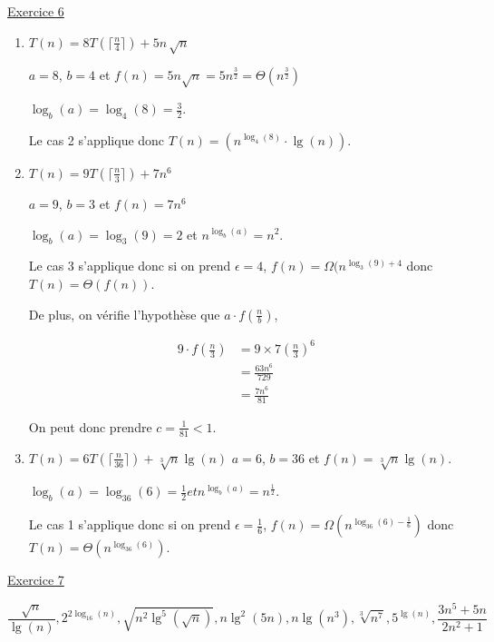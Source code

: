 \documentclass[11pt]{article}
\begin{document}
\bigskip

\underline{Exercice 6} 



\begin{enumerate}[label=\alph*)]
   \item $T(n)=8 T \left( \lceil{\frac{n}{4}} \rceil\right) + 5 n \, \sqrt{n} $
   
   $a=8$, $b=4$ et $f(n) = 5n\sqrt{n} = 5n^{\frac{3}{2}} = \Theta(n^{\frac{3}{2}})$

   $\log_b(a) = \log_4(8) = \frac{3}{2}$.

    Le cas 2 s'applique donc $T(n)=\left(n^{\log_4(8)}\cdot \lg(n)\right)$.
    
     \item $T(n)=9T \left( \lceil{\frac{n}{3}} \rceil\right) + 7n^6 $

    $a=9$, $b=3$ et $f(n) = 7n^{6}$

    $\log_b(a) = \log_3(9) = 2$ et $n^{\log_b(a)}=n^{2}$.

    Le cas 3 s'applique donc si on prend $\epsilon=4$, $f(n) = \Omega(n^{\log_3(9)+4}$ donc $T(n)=\Theta(f(n))$.
    
    De plus, on vérifie l'hypothèse que $a\cdot f\left(\frac{n}{b}\right)$,
    
    \begin{align*}
        9\cdot f\left(\frac{n}{3}\right) &= 9 \times 7\left(\frac{n}{3}\right)^{6}\\
        &= \frac{63n^{6}}{729}\\
        &= \frac{7n^{6}}{81}
    \end{align*}
    
    On peut donc prendre $c=\frac{1}{81}<1$.
    
    \item $T(n)=6 T \left( \lceil{\frac{n}{36}} \rceil\right) + \sqrt[3]{n} \lg(n) $
    $a = 6$, $b=36$ et $f(n)=\sqrt[3]{n} \lg(n)$.

    $\log_b(a) = \log_{36} (6) = \frac{1}{2} et n^{\log_b(a)}=n^{\frac{1}{2}}$.
    
    Le cas 1 s'applique donc si on prend $\epsilon=\frac{1}{6}$, $f(n) = \Omega\left(n^{\log_{36}(6)-\frac{1}{6}}\right)$ donc $T(n)=\Theta\left(n^{\log_{36}(6)}\right)$.

\end{enumerate}

\bigskip


\underline{Exercice 7} 

$$\frac{\sqrt{n}}{\lg(n)}, 2^{2 \log_{16}(n)}, \sqrt{n^2 \lg^5 \left(\sqrt{n}\right)}, n \lg^2(5n),n \lg(n^3), \sqrt[3]{n^7}, 5^{\lg(n)}, \frac{3n^5+5n}{2n^2+1}$$
\end{document}
